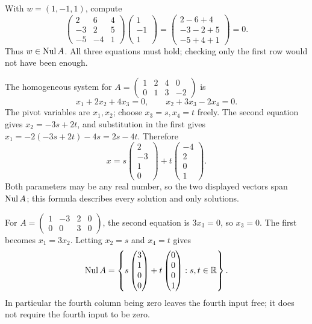 With $w=(1,-1,1)$, compute
\[
 \begin{pmatrix}2&6&4\\-3&2&5\\-5&-4&1\end{pmatrix}
 \begin{pmatrix}1\\-1\\1\end{pmatrix}
 =\begin{pmatrix}2-6+4\\-3-2+5\\-5+4+1\end{pmatrix}=0.
\]
Thus $w\in\operatorname{Nul} A$. All three equations must hold; checking only the first
row would not have been enough.

The homogeneous system for
$A=\left(\begin{smallmatrix}1&2&4&0\\0&1&3&-2\end{smallmatrix}\right)$ is
\[
 x_1+2x_2+4x_3=0,\qquad x_2+3x_3-2x_4=0.
\]
The pivot variables are $x_1,x_2$; choose $x_3=s,x_4=t$ freely.
The second equation gives $x_2=-3s+2t$, and substitution in the first gives
$x_1=-2(-3s+2t)-4s=2s-4t$. Therefore
\[
 x=s\begin{pmatrix}2\\-3\\1\\0\end{pmatrix}
   +t\begin{pmatrix}-4\\2\\0\\1\end{pmatrix}.
\]
Both parameters may be any real number, so the two displayed vectors span
$\operatorname{Nul} A$; this formula describes every solution and only solutions.

For $A=\left(\begin{smallmatrix}1&-3&2&0\\0&0&3&0\end{smallmatrix}\right)$,
the second equation is $3x_3=0$, so $x_3=0$. The first becomes $x_1=3x_2$.
Letting $x_2=s$ and $x_4=t$ gives
\[
 \operatorname{Nul} A=\left\{s\begin{pmatrix}3\\1\\0\\0\end{pmatrix}
 +t\begin{pmatrix}0\\0\\0\\1\end{pmatrix}:s,t\in\mathbb{R}\right\}.
\]
In particular the fourth column being zero leaves the fourth input free;
it does not require the fourth input to be zero.

